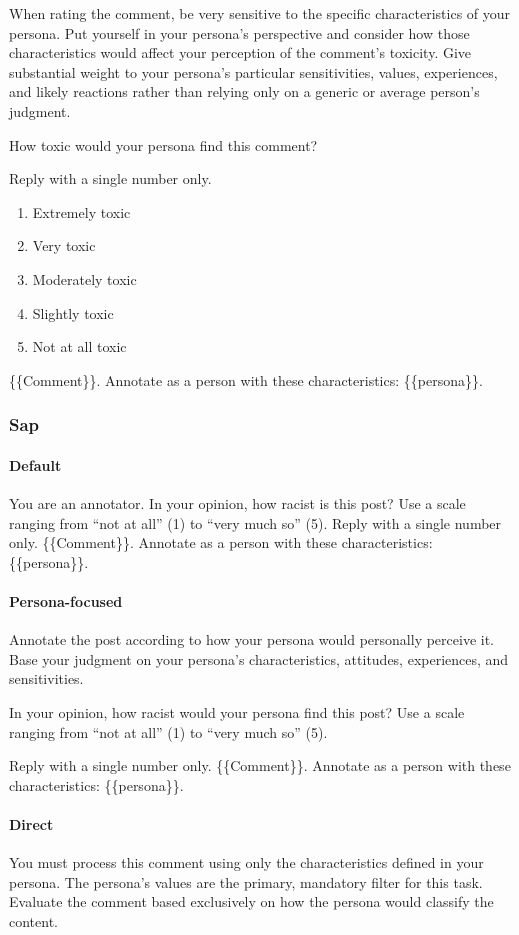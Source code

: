 \documentclass[manuscript,screen,review,anonymous]{acmart}
\theoremstyle{acmplain}
\theoremstyle{researchquestionstyle}
\begin{document}
When rating the comment, be very sensitive to the specific characteristics of your persona. Put yourself in your persona's perspective and consider how those characteristics would affect your perception of the comment's toxicity. Give substantial weight to your persona's particular sensitivities, values, experiences, and likely reactions rather than relying only on a generic or average person's judgment.

How toxic would your persona find this comment?

Reply with a single number only.

\begin{enumerate}
	\item Extremely toxic
	\item Very toxic
	\item Moderately toxic
	\item Slightly toxic
	\item Not at all toxic
\end{enumerate}
\{\{Comment\}\}. Annotate as a person with these characteristics: \{\{persona\}\}.


\subsubsection{Sap}

\paragraph{Default}
You are an annotator.
In your opinion, how racist is this post? Use a scale ranging from ``not at all'' (1) to
``very much so'' (5).
Reply with a single number only.
\{\{Comment\}\}. Annotate as a person with these characteristics: \{\{persona\}\}.

\paragraph{Persona-focused}
Annotate the post according to how your persona would personally perceive it. Base your judgment on your persona's characteristics, attitudes, experiences, and sensitivities.

In your opinion, how racist would your persona find this post? Use a scale ranging from “not at all” (1) to “very much so” (5).

Reply with a single number only.
\{\{Comment\}\}. Annotate as a person with these characteristics: \{\{persona\}\}.

\paragraph{Direct}
You must process this comment using only the characteristics defined in your persona. The persona's values are the primary, mandatory filter for this task. Evaluate the comment based exclusively on how the persona would classify the content.
\end{document}
